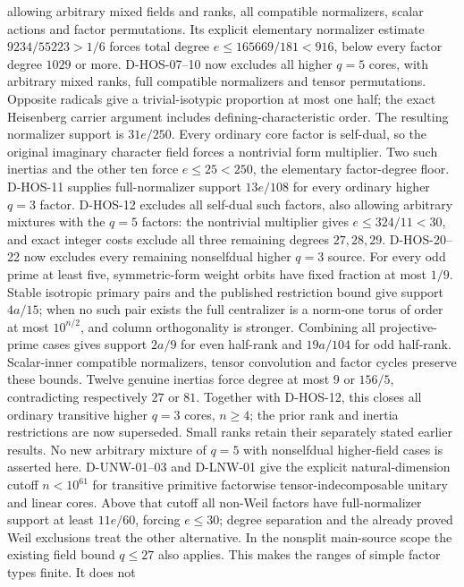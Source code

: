 \documentclass[11pt]{article}
\theoremstyle{remark}\newtheorem{remark}[theorem]{Remark}
\begin{document}
allowing arbitrary mixed fields and ranks, all compatible normalizers,
scalar actions and factor permutations. Its explicit elementary
normalizer estimate $9234/55223>1/6$ forces total degree
$e\le165669/181<916$, below every factor degree $1029$ or more.
D-HOS-07--10 now excludes all higher $q=5$ cores, with arbitrary
mixed ranks, full compatible normalizers and tensor permutations.
Opposite radicals give a trivial-isotypic proportion at most one half;
the exact Heisenberg carrier argument includes defining-characteristic
order. The resulting normalizer support is $31e/250$. Every ordinary
core factor is self-dual, so the original imaginary character field
forces a nontrivial form multiplier. Two such inertias and the other
ten force $e\le25<250$, the elementary factor-degree floor.
D-HOS-11 supplies full-normalizer support $13e/108$ for every
ordinary higher $q=3$ factor. D-HOS-12 excludes all self-dual such
factors, also allowing arbitrary mixtures with the $q=5$ factors:
the nontrivial multiplier gives $e\le324/11<30$, and exact integer
costs exclude all three remaining degrees $27,28,29$. D-HOS-20--22 now excludes every remaining nonselfdual higher $q=3$
source. For every odd prime at least five, symmetric-form weight
orbits have fixed fraction at most $1/9$. Stable isotropic primary
pairs and the published restriction bound give support $4a/15$;
when no such pair exists the full centralizer is a norm-one torus
of order at most $10^{n/2}$, and column orthogonality is stronger.
Combining all projective-prime cases gives support $2a/9$ for even
half-rank and $19a/104$ for odd half-rank. Scalar-inner compatible
normalizers, tensor convolution and factor cycles preserve these
bounds. Twelve genuine inertias force degree at most $9$ or $156/5$,
contradicting respectively $27$ or $81$. Together with D-HOS-12,
this closes all ordinary transitive higher $q=3$ cores, $n\ge4$;
the prior rank and inertia restrictions are now superseded.
Small ranks retain their separately stated earlier results. No new
arbitrary mixture of $q=5$ with nonselfdual higher-field cases is
asserted here.
D-UNW-01--03 and D-LNW-01 give the explicit natural-dimension cutoff
$n<10^{61}$ for transitive primitive factorwise tensor-indecomposable
unitary and linear cores. Above that cutoff all non-Weil factors have
full-normalizer support at least $11e/60$, forcing $e\le30$;
degree separation and the already proved Weil exclusions treat the
other alternative. In the nonsplit main-source scope the existing
field bound $q\le27$ also applies. This makes the ranges of simple factor types finite. It does not
\end{document}
